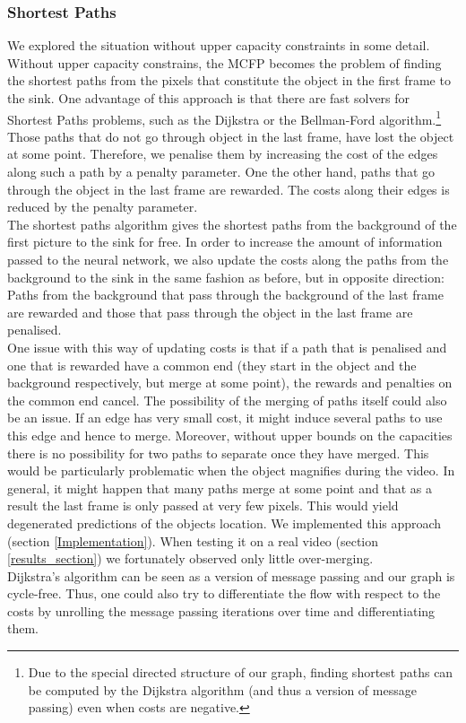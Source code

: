 \documentclass{article}
\begin{document}
{\subsubsection{Shortest Paths}\label{shortestPaths}
We explored the situation without upper capacity constraints in some detail. Without upper capacity constrains, the MCFP becomes the problem of finding the shortest paths from the pixels that constitute the object in the first frame to the sink. One advantage of this approach is that there are fast solvers for Shortest Paths problems, such as the Dijkstra  or the Bellman-Ford algorithm.\footnote{Due to the special directed structure of our graph, finding shortest paths can be computed by the Dijkstra algorithm (and thus a version of message passing) even when costs are negative.}
Those paths that do not go through object in the last frame, have lost the object at some point. Therefore, we penalise them by increasing the cost of the edges along such a path by a penalty parameter. One the other hand, paths that go through the object in the last frame are rewarded. The costs along their edges is reduced by the penalty parameter.\\
The shortest paths algorithm gives the shortest paths from the background of the first picture to the sink for free. In order to increase the amount of information passed to the neural network, we also update the costs along the paths from the background to the sink in the same fashion as before, but in opposite direction: Paths from the background that pass through the background of the last frame are rewarded and those that pass through the object in the last frame are penalised.\\
One issue with this way of updating costs is that if a path that is penalised and one that is rewarded have a common end (they start in the object and the background respectively, but merge at some point), the rewards and penalties on the common end cancel. The possibility of the merging of paths itself could also be an issue. If an edge has very small cost, it might induce several paths to use this edge and hence to merge. Moreover, without upper bounds on the capacities there is no possibility for two paths to separate once they have merged. This would be particularly problematic when the object magnifies during the video. In general, it might happen that many paths merge at some point and that as a result the last frame is only passed at very few pixels. This would yield degenerated predictions of the objects location. We implemented this approach (section \ref{Implementation}). When testing it on a real video (section \ref{results_section}) we fortunately observed only little over-merging. \\
Dijkstra's algorithm can be seen as a version of message passing and our graph is cycle-free. Thus, one could also try to differentiate the flow with respect to the costs by unrolling the message passing iterations over time and differentiating them.

}
\end{document}
